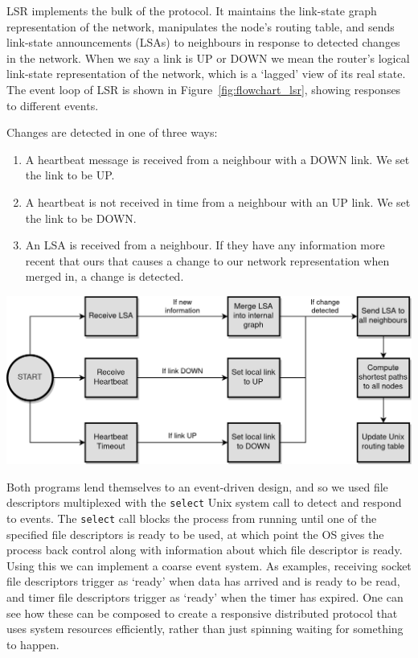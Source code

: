 \documentclass[withindex,glossary,openany]{cam-thesis}
\begin{document}
LSR implements the bulk of the protocol. It maintains the link-state graph representation of the network, manipulates the node's routing table, and sends link-state announcements (LSAs) to neighbours in response to detected changes in the network. When we say a link is UP or DOWN we mean the router's logical link-state representation of the network, which is a `lagged' view of its real state. The event loop of LSR is shown in Figure~\ref{fig:flowchart_lsr}, showing responses to different events.

Changes are detected in one of three ways:
\begin{enumerate}
	\item
	A heartbeat message is received from a neighbour with a DOWN link. We set the link to be UP.
	
	\item
	A heartbeat is not received in time from a neighbour with an UP link. We set the link to be DOWN.
	
	\item
	An LSA is received from a neighbour. If they have any information more recent that ours that causes a change to our network representation when merged in, a change is detected.
\end{enumerate}

\begin{center}
\begin{minipage}{0.9\textwidth} \centering
	\includegraphics[width=1\textwidth]{flowchart_lsr}
	\label{fig:flowchart_lsr}
\end{minipage}
\end{center}

Both programs lend themselves to an event-driven design, and so we used file descriptors multiplexed with the \texttt{select} Unix system call to detect and respond to events. The \texttt{select} call blocks the process from running until one of the specified file descriptors is ready to be used, at which point the OS gives the process back control along with information about which file descriptor is ready. Using this we can implement a coarse event system. As examples, receiving socket file descriptors trigger as `ready' when data has arrived and is ready to be read, and timer file descriptors trigger as `ready' when the timer has expired. One can see how these can be composed to create a responsive distributed protocol that uses system resources efficiently, rather than just spinning waiting for something to happen.
\end{document}
